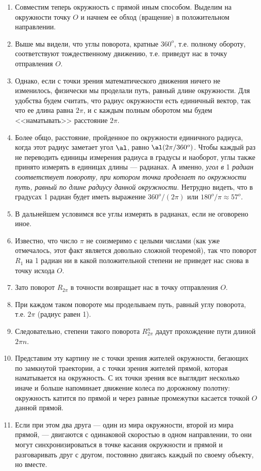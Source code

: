 \begin{enumerate}
\item Совместим теперь окружность с прямой иным способом. Выделим на окружности точку $O$ и начнем ее обход (вращение) в положительном направлении.
\item Выше мы видели, что углы поворота, кратные $360^o$, т.е. полному обороту, соответствуют тождественному движению, т.е. приведут нас в точку отправления $O$.
\item Однако, если с точки зрения математического движения ничего не изменилось, физически мы проделали путь, равный длине окружности. Для удобства будем считать, что радиус окружности есть единичный вектор, так что ее длина равна $2\pi$, и с каждым полным оборотом мы будем <<наматывать>> расстояние $2\pi$.
\item Более общо, расстояние, пройденное по окружности единичного радиуса, когда этот радиус заметает угол $\al$, равно $\al(2\pi/360^o)$. Чтобы каждый раз не переводить единицы измерения радиуса в градусы и наоборот, углы также принято измерять в единицах длины --- радианах. А именно, \textit{угол в} 1 \textit{радиан соответствует повороту, при котором точка проделает по окружности путь, равный по длине радиусу данной окружности}. Нетрудно видеть, что в градусах 1 радиан будет иметь выражение $360^o/(2\pi)$ или $180^o/\pi \approx 57^o$.
\item В дальнейшем условимся все углы измерять в радианах, если не оговорено иное.
\item Известно, что число $\pi$ не соизмеримо с целыми числами (как уже отмечалось, этот факт является довольно сложной теоремой), так что поворот $R_1$ на 1 радиан ни в какой положительной степени не приведет нас снова в точку исхода $O$.
\item Зато поворот $R_{2\pi}$ в точности возвращает нас в точку отправления $O$.
\item При каждом таком повороте мы проделываем путь, равный углу поворота, т.е. $2\pi$ (радиус равен 1).
\item Следовательно, степени такого поворота $R_{2\pi}^n$ дадут прохождение пути длиной $2\pi n$.
\item Представим эту картину не с точки зрения жителей окружности, бегающих по замкнутой траектории, а с точки зрения жителей прямой, которая наматывается на окружность. С их точки зрения все выглядит несколько иначе и больше напоминает движение колеса по дорожному полотну: окружность катится по прямой и через равные промежутки касается точкой $O$ данной прямой.
\item Если при этом два друга --- один из мира окружности, второй из мира прямой, --- двигаются с одинаковой скоростью в одном направлении, то они могут синхронизироваться в точке касания окружности и прямой и разговаривать друг с другом, постоянно двигаясь каждый по своему объекту, но вместе.

\end{enumerate}
